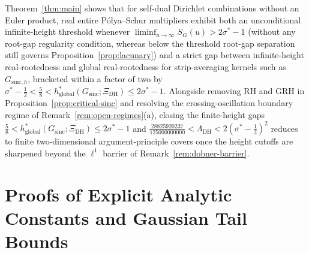 \documentclass[11pt,a4paper,reqno]{amsart}
\theoremstyle{definition}
\theoremstyle{remark}
\numberwithin{equation}{section}
\begin{document}
Theorem~\ref{thm:main} shows that for self-dual Dirichlet combinations without an Euler product, real entire P\'olya--Schur multipliers exhibit both an unconditional infinite-height threshold whenever $\liminf_{u\to\infty} S_G(u) > 2\sigma^* - 1$ (without any root-gap regularity condition, whereas below the threshold root-gap separation still governs Proposition~\ref{prop:lacunary}) and a strict gap between infinite-height real-rootedness and global real-rootedness for strip-averaging kernels such as $G_{\mathrm{sinc},h}$, bracketed within a factor of two by $\sigma^* - \frac{1}{2} < \frac{5}{8} < h_{\mathrm{global}}^*(G_{\mathrm{sinc}}; \Xi_{\mathrm{DH}}) \le 2\sigma^* - 1$. Alongside removing RH and GRH in Proposition~\ref{prop:critical-sinc} and resolving the crossing-oscillation boundary regime of Remark~\ref{rem:open-regimes}(a), closing the finite-height gaps $\frac{5}{8} < h_{\mathrm{global}}^*(G_{\mathrm{sinc}}; \Xi_{\mathrm{DH}}) \le 2\sigma^* - 1$ and $\frac{28825920237}{125000000000} < \Lambda_{\mathrm{DH}} < 2(\sigma^* - \frac{1}{2})^2$ reduces to finite two-dimensional argument-principle covers once the height cutoffs are sharpened beyond the $\ell^1$ barrier of Remark~\ref{rem:dobner-barrier}.

\appendix

\section{Proofs of Explicit Analytic Constants and Gaussian Tail Bounds}
\label{app:analytic-constants}
\end{document}
